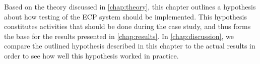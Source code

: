 Based on the theory discussed in \ref{chap:theory}, this chapter
outlines a hypothesis about how testing of the ECP system should be
implemented. This hypothesis constitutes activities that should be done
during the case study, and thus forms the base for the results presented
in \ref{chap:results}. In \ref{chap:discussion}, we compare the outlined
hypothesis described in this chapter to the actual results in order to
see how well this hypothesis worked in practice.
